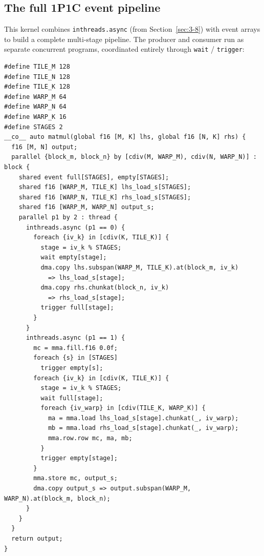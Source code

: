 \subsection*{The full 1P1C event pipeline}

This kernel combines \texttt{inthreads.\allowbreak{}async} (from Section~\ref{sec:3-8}) with event arrays to build a complete multi-stage pipeline. The producer and consumer run as separate concurrent programs, coordinated entirely through \texttt{wait} / \texttt{trigger}:

\begin{lstlisting}[language=croqtile,caption={The full 1P1C event pipeline}]
#define TILE_M 128
#define TILE_N 128
#define TILE_K 128
#define WARP_M 64
#define WARP_N 64
#define WARP_K 16
#define STAGES 2
__co__ auto matmul(global f16 [M, K] lhs, global f16 [N, K] rhs) {
  f16 [M, N] output;
  parallel {block_m, block_n} by [cdiv(M, WARP_M), cdiv(N, WARP_N)] : block {
    shared event full[STAGES], empty[STAGES];
    shared f16 [WARP_M, TILE_K] lhs_load_s[STAGES];
    shared f16 [WARP_N, TILE_K] rhs_load_s[STAGES];
    shared f16 [WARP_M, WARP_N] output_s;
    parallel p1 by 2 : thread {
      inthreads.async (p1 == 0) {
        foreach {iv_k} in [cdiv(K, TILE_K)] {
          stage = iv_k % STAGES;
          wait empty[stage];
          dma.copy lhs.subspan(WARP_M, TILE_K).at(block_m, iv_k)
            => lhs_load_s[stage];
          dma.copy rhs.chunkat(block_n, iv_k)
            => rhs_load_s[stage];
          trigger full[stage];
        }
      }
      inthreads.async (p1 == 1) {
        mc = mma.fill.f16 0.0f;
        foreach {s} in [STAGES]
          trigger empty[s];
        foreach {iv_k} in [cdiv(K, TILE_K)] {
          stage = iv_k % STAGES;
          wait full[stage];
          foreach {iv_warp} in [cdiv(TILE_K, WARP_K)] {
            ma = mma.load lhs_load_s[stage].chunkat(_, iv_warp);
            mb = mma.load rhs_load_s[stage].chunkat(_, iv_warp);
            mma.row.row mc, ma, mb;
          }
          trigger empty[stage];
        }
        mma.store mc, output_s;
        dma.copy output_s => output.subspan(WARP_M, WARP_N).at(block_m, block_n);
      }
    }
  }
  return output;
}
\end{lstlisting}
